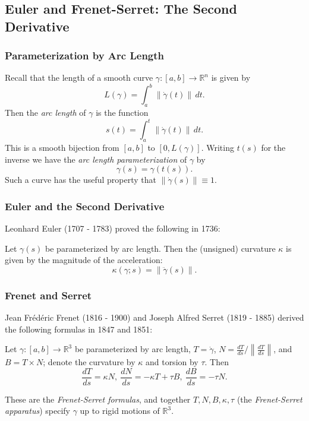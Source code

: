 \documentclass{beamer}
\newcommand{\R}{\mathbb{R}}
\newcommand{\norm}[1]{\left\lVert#1\right\rVert}
\theoremstyle{definition}
\begin{document}
\subsection{Euler and Frenet-Serret: The Second Derivative}

\begin{frame}
    \frametitle{Parameterization by Arc Length}

    Recall that the length of a smooth curve $\gamma : [a,b] \to \R^n$ is given by
    \[
        L(\gamma) = \int_a^b \norm{\dot\gamma(t)} \,dt.
    \]
    Then the \emph{arc length} of $\gamma$ is the function
    \[
        s(t) = \int_a^t \norm{\dot\gamma(t)} \,dt.
    \]
    This is a smooth bijection from $[a,b]$ to $[0,L(\gamma)]$. Writing $t(s)$ for the inverse
    we have the \emph{arc length parameterization} of $\gamma$ by
    \[
      \gamma(s) = \gamma(t(s)).
    \]
    Such a curve has the useful property that $\norm{\dot\gamma(s)} \equiv 1$.
\end{frame}

\begin{frame}
    \frametitle{Euler and the Second Derivative}

    Leonhard Euler (1707 - 1783) proved the following in 1736: \cite{geom-diff-view}

    \begin{theorem}
        Let $\gamma(s)$ be parameterized by arc length. Then the (unsigned) curvature
        $\kappa$ is given by the magnitude of the acceleration:
        \[
          \kappa(\gamma;s) = \norm{\ddot\gamma(s)}.
        \]
    \end{theorem}
\end{frame}

\begin{frame}
    \frametitle{Frenet and Serret}

    Jean Frédéric Frenet (1816 - 1900) and Joseph Alfred Serret (1819 - 1885)
    derived the following formulas in 1847 and 1851:

    \begin{theorem}
        Let $\gamma : [a,b] \to \R^3$ be parameterized by arc length, $T = \dot\gamma$,
        $N = \frac{dT}{ds}/\norm{\frac{dT}{ds}}$, and $B = T \times N$;
        denote the curvature by $\kappa$ and torsion by $\tau$. Then
        \[
            \frac{dT}{ds} = \kappa N, \
            \frac{dN}{ds} = -\kappa T + \tau B, \
            \frac{dB}{ds} = -\tau N.
        \]
    \end{theorem}
    These are the \emph{Frenet-Serret formulas}, and together $T,N,B,\kappa,\tau$
    (the \emph{Frenet-Serret apparatus}) specify $\gamma$ up to rigid motions of $\R^3$.
\end{frame}
\end{document}
